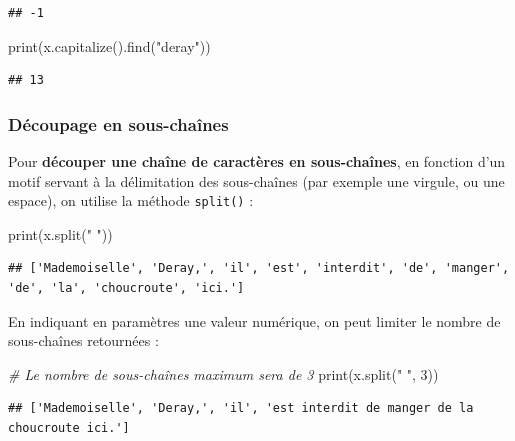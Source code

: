 \documentclass[12pt,]{book}
\newenvironment{Shaded}{\begin{snugshade}}{\end{snugshade}}
\newcommand{\DecValTok}[1]{\textcolor[rgb]{0.00,0.00,0.81}{#1}}
\newcommand{\StringTok}[1]{\textcolor[rgb]{0.31,0.60,0.02}{#1}}
\newcommand{\CommentTok}[1]{\textcolor[rgb]{0.56,0.35,0.01}{\textit{#1}}}
\newcommand{\BuiltInTok}[1]{#1}
\newcommand{\NormalTok}[1]{#1}
\numberwithin{equation}{section}
\numberwithin{countremarque}{section}
\begin{document}
\begin{lstlisting}
## -1
\end{lstlisting}

\begin{Shaded}
\begin{Highlighting}[]
\BuiltInTok{print}\NormalTok{(x.capitalize().find(}\StringTok{"deray"}\NormalTok{))}
\end{Highlighting}
\end{Shaded}

\begin{lstlisting}
## 13
\end{lstlisting}

\subsubsection{Découpage en
sous-chaînes}\label{decoupage-en-sous-chaines}

Pour \textbf{découper une chaîne de caractères en sous-chaînes}, en
fonction d'un motif servant à la délimitation des sous-chaînes (par
exemple une virgule, ou une espace), on utilise la méthode
\texttt{split()} :

\begin{Shaded}
\begin{Highlighting}[]
\BuiltInTok{print}\NormalTok{(x.split(}\StringTok{" "}\NormalTok{))}
\end{Highlighting}
\end{Shaded}

\begin{lstlisting}
## ['Mademoiselle', 'Deray,', 'il', 'est', 'interdit', 'de', 'manger', 'de', 'la', 'choucroute', 'ici.']
\end{lstlisting}

En indiquant en paramètres une valeur numérique, on peut limiter le
nombre de sous-chaînes retournées :

\begin{Shaded}
\begin{Highlighting}[]
\CommentTok{# Le nombre de sous-chaînes maximum sera de 3}
\BuiltInTok{print}\NormalTok{(x.split(}\StringTok{" "}\NormalTok{, }\DecValTok{3}\NormalTok{))}
\end{Highlighting}
\end{Shaded}

\begin{lstlisting}
## ['Mademoiselle', 'Deray,', 'il', 'est interdit de manger de la choucroute ici.']
\end{lstlisting}
\end{document}
